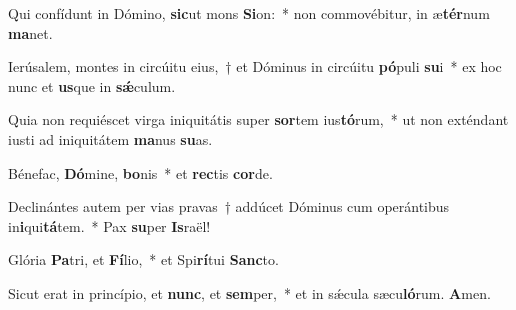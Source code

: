 \item Qui confídunt in Dómino, \textbf{sic}ut mons \textbf{Si}on:~* non commovébitur, in æ\textbf{tér}num \textbf{ma}net.

\item Ierúsalem, montes in circúitu eius,~† et Dóminus in circúitu \textbf{pó}puli \textbf{su}i~* ex hoc nunc et \textbf{us}que in \textbf{sǽ}culum.

\item Quia non requiéscet virga iniquitátis super \textbf{sor}tem ius\textbf{tó}rum,~* ut non exténdant iusti ad iniquitátem \textbf{ma}nus \textbf{su}as.

\item Bénefac, \textbf{Dó}mine, \textbf{bo}nis~* et \textbf{rec}tis \textbf{cor}de.

\item Declinántes autem per vias pravas~† addúcet Dóminus cum operántibus in\textbf{i}qui\textbf{tá}tem.~* Pax \textbf{su}per \textbf{Is}raël!

\item Glória \textbf{Pa}tri, et \textbf{Fí}lio,~* et Spi\textbf{rí}tui \textbf{Sanc}to.

\item Sicut erat in princípio, et \textbf{nunc}, et \textbf{sem}per,~* et in sǽcula sæcu\textbf{ló}rum. \textbf{A}men.